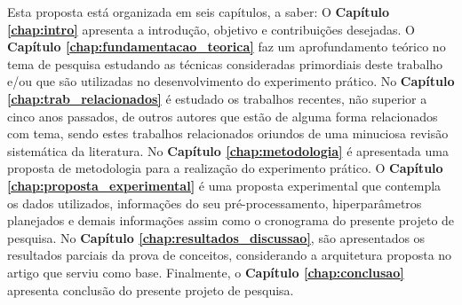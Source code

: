 Esta proposta está organizada em seis capítulos, a saber:
O \textbf{Capítulo \ref{chap:intro}} apresenta a introdução, objetivo e contribuições desejadas. O \textbf{Capítulo \ref{chap:fundamentacao_teorica}} faz um aprofundamento teórico no tema de pesquisa estudando as técnicas consideradas primordiais deste trabalho e/ou que são utilizadas no desenvolvimento do experimento prático. No \textbf{Capítulo \ref{chap:trab_relacionados}} é estudado  os trabalhos recentes, não superior a cinco anos passados, de outros autores que estão de alguma forma relacionados com tema, sendo estes trabalhos relacionados oriundos de uma minuciosa revisão sistemática da literatura. No \textbf{Capítulo \ref{chap:metodologia}} é apresentada uma proposta de metodologia para a realização do experimento prático. O \textbf{Capítulo \ref{chap:proposta_experimental}} é uma proposta experimental que contempla os dados utilizados, informações do seu pré-processamento, hiperparâmetros planejados e demais informações assim como o cronograma do presente projeto de pesquisa. No \textbf{Capítulo \ref{chap:resultados_discussao}}, são apresentados os resultados parciais da prova de conceitos, considerando a arquitetura proposta no artigo que serviu como base. Finalmente, o \textbf{Capítulo \ref{chap:conclusao}} apresenta conclusão do presente projeto de pesquisa.
